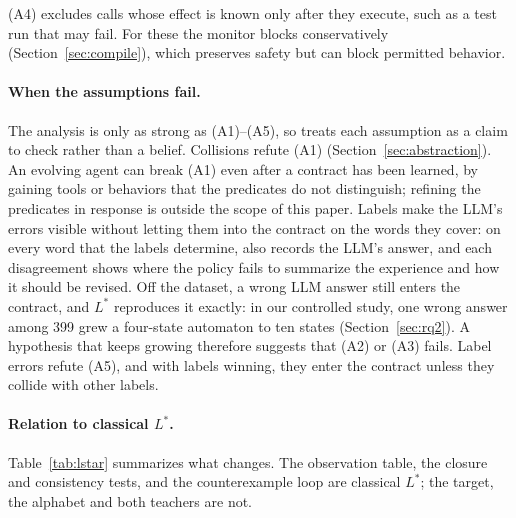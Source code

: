 (A4) excludes calls whose effect is known only after they execute, such as a test run that may fail. For these the monitor blocks conservatively (Section~\ref{sec:compile}), which preserves safety but can block permitted behavior.

\paragraph{When the assumptions fail.}
The analysis is only as strong as (A1)--(A5), so \system treats each assumption as a claim to check rather than a belief. Collisions refute (A1) (Section~\ref{sec:abstraction}). An evolving agent can break (A1) even after a contract has been learned, by gaining tools or behaviors that the predicates do not distinguish; refining the predicates in response is outside the scope of this paper. Labels make the LLM's errors visible without letting them into the contract on the words they cover: on every word that the labels determine, \system also records the LLM's answer, and each disagreement shows where the policy fails to summarize the experience and how it should be revised. Off the dataset, a wrong LLM answer still enters the contract, and $L^*$ reproduces it exactly: in our controlled study, one wrong answer among 399 grew a four-state automaton to ten states (Section~\ref{sec:rq2}). A hypothesis that keeps growing therefore suggests that (A2) or (A3) fails. Label errors refute (A5), and with labels winning, they enter the contract unless they collide with other labels.

\paragraph{Relation to classical $L^*$.}
Table~\ref{tab:lstar} summarizes what changes. The observation table, the closure and consistency tests, and the counterexample loop are classical $L^*$; the target, the alphabet and both teachers are not.


